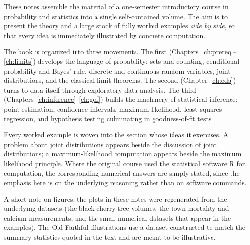 \documentclass[11pt,openany]{book}
\theoremstyle{definition}
\theoremstyle{plain}
\newcounter{example}[chapter]
\begin{document}
These notes assemble the material of a one-semester introductory course in
probability and statistics into a single self-contained volume. The aim is to
present the theory and a large stock of fully worked examples \emph{side by
side}, so that every idea is immediately illustrated by concrete computation.

The book is organized into three movements. The first
(Chapters~\ref{ch:prereq}--\ref{ch:limits}) develops the language of
probability: sets and counting, conditional probability and Bayes' rule,
discrete and continuous random variables, joint distributions, and the
classical limit theorems. The second (Chapter~\ref{ch:eda}) turns to data
itself through exploratory data analysis. The third
(Chapters~\ref{ch:inference}--\ref{ch:gof}) builds the machinery of
statistical inference: point estimation, confidence intervals, maximum
likelihood, least-squares regression, and hypothesis testing culminating in
goodness-of-fit tests.

Every worked example is woven into the section whose ideas it exercises. A
problem about joint distributions appears beside the discussion of joint
distributions; a maximum-likelihood computation appears beside the maximum
likelihood principle. Where the original course used the statistical
software \textsf{R} for computation, the corresponding numerical answers are
simply stated, since the emphasis here is on the underlying reasoning rather
than on software commands.

A short note on figures: the plots in these notes were regenerated from the
underlying datasets (the black cherry tree volumes, the town mortality and
calcium measurements, and the small numerical datasets that appear in the
examples). The Old Faithful illustrations use a dataset constructed to match
the summary statistics quoted in the text and are meant to be illustrative.

\tableofcontents

\mainmatter













\end{document}

